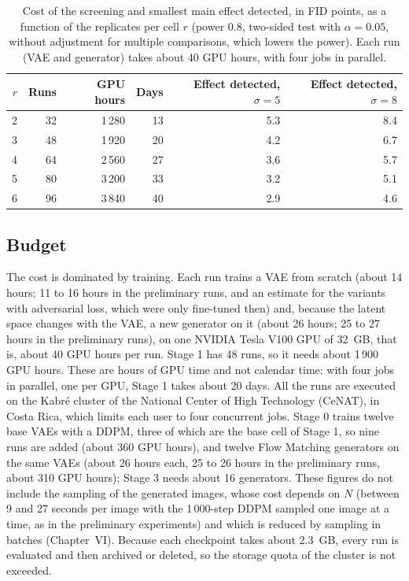 \begin{table}[H]
\centering
\small
\begin{tabular}{rrrrrr}
\hline
$r$ & \textbf{Runs} & \textbf{GPU hours} & \textbf{Days} & \textbf{Effect detected, $\sigma=5$} & \textbf{Effect detected, $\sigma=8$} \\
\hline
2 & 32 & 1\,280 & 13 & 5.3 & 8.4 \\
3 & 48 & 1\,920 & 20 & 4.2 & 6.7 \\
4 & 64 & 2\,560 & 27 & 3.6 & 5.7 \\
5 & 80 & 3\,200 & 33 & 3.2 & 5.1 \\
6 & 96 & 3\,840 & 40 & 2.9 & 4.6 \\
\hline
\end{tabular}
\caption{Cost of the screening and smallest main effect detected, in FID points, as a function of the replicates per cell $r$ (power 0.8, two-sided test with $\alpha=0.05$, without adjustment for multiple comparisons, which lowers the power). Each run (VAE and generator) takes about 40 GPU hours, with four jobs in parallel.}
\label{tab:replicates}
\end{table}

\subsection{Budget}

The cost is dominated by training. Each run trains a VAE from scratch (about 14 hours; 11 to 16 hours in the preliminary runs, and an estimate for the variants with adversarial loss, which were only fine-tuned then) and, because the latent space changes with the VAE, a new generator on it (about 26 hours; 25 to 27 hours in the preliminary runs), on one NVIDIA Tesla V100 GPU of 32~GB, that is, about 40 GPU hours per run. Stage 1 has 48 runs, so it needs about 1\,900 GPU hours. These are hours of GPU time and not calendar time: with four jobs in parallel, one per GPU, Stage 1 takes about 20 days. All the runs are executed on the Kabr\'e cluster of the National Center of High Technology (CeNAT), in Costa Rica, which limits each user to four concurrent jobs. Stage 0 trains twelve base VAEs with a DDPM, three of which are the base cell of Stage 1, so nine runs are added (about 360 GPU hours), and twelve Flow Matching generators on the same VAEs (about 26 hours each, 25 to 26 hours in the preliminary runs, about 310 GPU hours); Stage 3 needs about 16 generators. These figures do not include the sampling of the generated images, whose cost depends on $N$ (between 9 and 27 seconds per image with the 1\,000-step DDPM sampled one image at a time, as in the preliminary experiments) and which is reduced by sampling in batches (Chapter~VI). Because each checkpoint takes about 2.3~GB, every run is evaluated and then archived or deleted, so the storage quota of the cluster is not exceeded.

